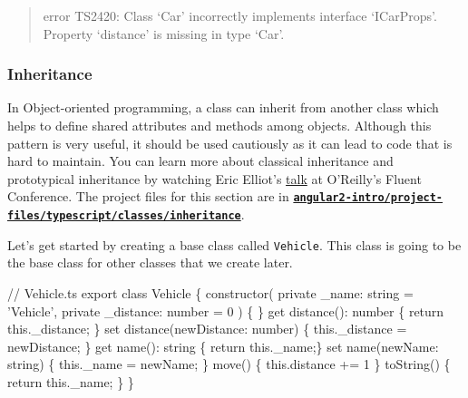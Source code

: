 \documentclass[12pt,]{article}
\newenvironment{Shaded}{}{}
\newcommand{\KeywordTok}[1]{\textcolor[rgb]{0.00,0.00,1.00}{{#1}}}
\newcommand{\DecValTok}[1]{{#1}}
\newcommand{\CommentTok}[1]{\textcolor[rgb]{0.00,0.50,0.00}{{#1}}}
\newcommand{\FunctionTok}[1]{{#1}}
\newcommand{\NormalTok}[1]{{#1}}
\begin{document}
\begin{quote}
error TS2420: Class `Car' incorrectly implements interface `ICarProps'.
Property `distance' is missing in type `Car'.
\end{quote}

\subsubsection{Inheritance}\label{inheritance}

In Object-oriented programming, a class can inherit from another class
which helps to define shared attributes and methods among objects.
Although this pattern is very useful, it should be used cautiously as it
can lead to code that is hard to maintain. You can learn more about
classical inheritance and prototypical inheritance by watching Eric
Elliot's \href{https://www.youtube.com/watch?v=lKCCZTUx0sI}{talk} at
O'Reilly's Fluent Conference. The project files for this section are in
\href{https://github.com/aminmeyghani/angular2-intro/tree/master/project-files/typescript/classes/inheritance}{\textbf{\texttt{angular2-intro/project-files/typescript/classes/inheritance}}}.

Let's get started by creating a base class called \texttt{Vehicle}. This
class is going to be the base class for other classes that we create
later.

\begin{Shaded}
\begin{Highlighting}[numbers=left,,]
\CommentTok{// Vehicle.ts}
\NormalTok{export }\KeywordTok{class} \NormalTok{Vehicle \{}
  \FunctionTok{constructor}\NormalTok{( }\KeywordTok{private} \NormalTok{_name: string = 'Vehicle',}
               \KeywordTok{private} \NormalTok{_distance: number = }\DecValTok{0} \NormalTok{) \{ \}}
  \NormalTok{get }\FunctionTok{distance}\NormalTok{(): number \{ }\KeywordTok{return} \KeywordTok{this}\NormalTok{.}\FunctionTok{_distance}\NormalTok{; \}}
  \NormalTok{set }\FunctionTok{distance}\NormalTok{(newDistance: number) \{ }\KeywordTok{this}\NormalTok{.}\FunctionTok{_distance} \NormalTok{= newDistance; \}}
  \NormalTok{get }\FunctionTok{name}\NormalTok{(): string \{ }\KeywordTok{return} \KeywordTok{this}\NormalTok{.}\FunctionTok{_name}\NormalTok{;\}}
  \NormalTok{set }\FunctionTok{name}\NormalTok{(newName: string) \{ }\KeywordTok{this}\NormalTok{.}\FunctionTok{_name} \NormalTok{= newName; \}}
  \FunctionTok{move}\NormalTok{() \{ }\KeywordTok{this}\NormalTok{.}\FunctionTok{distance} \NormalTok{+= }\DecValTok{1} \NormalTok{\}}
  \FunctionTok{toString}\NormalTok{() \{ }\KeywordTok{return} \KeywordTok{this}\NormalTok{.}\FunctionTok{_name}\NormalTok{; \}}
\NormalTok{\}}
\end{Highlighting}
\end{Shaded}
\end{document}
